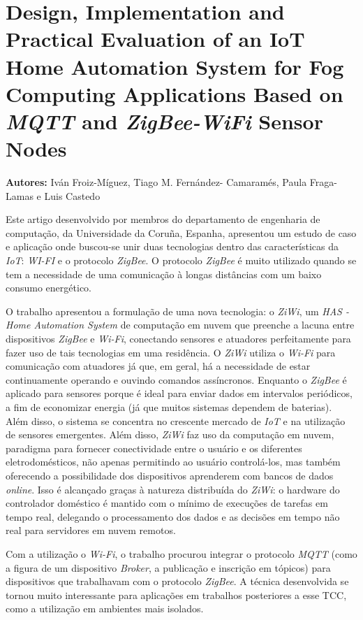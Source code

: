 \section{Design, Implementation and Practical Evaluation of an IoT Home Automation System for Fog Computing Applications Based on \textit{MQTT} and \textit {ZigBee-WiFi}	Sensor Nodes}

\textbf{Autores:} Iván Froiz-Míguez, Tiago M. Fernández- Camaramés, Paula Fraga-Lamas e Luis Castedo
\vspace{\onelineskip}

Este artigo desenvolvido por membros do departamento de engenharia de computação, da Universidade da Coruña, Espanha, apresentou um estudo de caso e aplicação onde buscou-se unir duas tecnologias dentro das características da \textit{IoT}: \textit{WI-FI} e o protocolo \textit{ZigBee}. O protocolo \textit{ZigBee} é muito utilizado quando se tem a necessidade de uma comunicação à longas distâncias com um baixo consumo energético.

O trabalho apresentou a formulação de uma nova tecnologia: o \textit{ZiWi}, um \textit{HAS - Home Automation System} de computação em nuvem que preenche a lacuna entre dispositivos \textit{ZigBee} e \textit{Wi-Fi}, conectando sensores e atuadores perfeitamente para fazer uso de tais tecnologias em uma residência. O \textit{ZiWi} utiliza o \textit{Wi-Fi} para comunicação com atuadores já que, em geral, há a necessidade de estar continuamente operando e ouvindo comandos assíncronos. Enquanto o \textit{ZigBee} é aplicado para sensores porque é ideal para enviar dados em intervalos periódicos, a fim de economizar energia (já que muitos sistemas dependem de baterias). Além disso, o sistema se concentra no crescente mercado de \textit{IoT} e na utilização de sensores emergentes. Além disso, \textit{ZiWi} faz uso da computação em nuvem, paradigma para fornecer conectividade entre o usuário e os diferentes eletrodomésticos, não apenas
permitindo ao usuário controlá-los, mas também oferecendo a possibilidade dos dispositivos aprenderem com bancos de dados \textit{online}. Isso é alcançado
graças à natureza distribuída do \textit{ZiWi}: o hardware do controlador doméstico é mantido com o mínimo de execuções de tarefas em tempo real, delegando o processamento dos dados e as decisões em tempo não real para servidores em nuvem remotos.

Com a utilização o \textit{Wi-Fi}, o trabalho procurou integrar o protocolo \textit{MQTT} (como a figura de um dispositivo \textit{Broker}, a publicação e inscrição em tópicos) para dispositivos que trabalhavam com o protocolo \textit{ZigBee}. A técnica desenvolvida se tornou muito interessante para aplicações em trabalhos posteriores a esse TCC, como a utilização em ambientes mais isolados.

